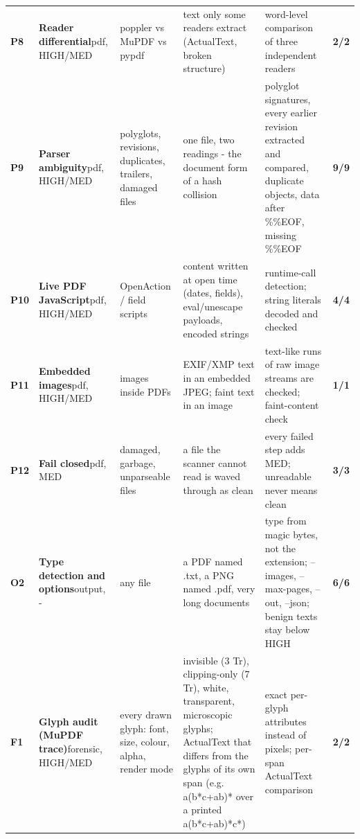 \documentclass[10pt,a4paper]{article}
\begin{document}
\begin{longtable}{@{}P{0.6cm}P{2.6cm}P{3.1cm}P{4.4cm}P{4.4cm}P{1.4cm}@{}}
\textbf{P8} & \textbf{Reader differential}\newline\footnotesize pdf, HIGH/MED & \footnotesize poppler vs MuPDF vs pypdf & \footnotesize text only some readers extract (ActualText, broken structure) & \footnotesize word-level comparison of three independent readers & \textcolor{ok}{\textbf{2/2}}\\
\textbf{P9} & \textbf{Parser ambiguity}\newline\footnotesize pdf, HIGH/MED & \footnotesize polyglots, revisions, duplicates, trailers, damaged files & \footnotesize one file, two readings - the document form of a hash collision & \footnotesize polyglot signatures, every earlier revision extracted and compared, duplicate objects, data after \%\%EOF, missing \%\%EOF & \textcolor{ok}{\textbf{9/9}}\\
\textbf{P10} & \textbf{Live PDF JavaScript}\newline\footnotesize pdf, HIGH/MED & \footnotesize OpenAction / field scripts & \footnotesize content written at open time (dates, fields), eval/unescape payloads, encoded strings & \footnotesize runtime-call detection; string literals decoded and checked & \textcolor{ok}{\textbf{4/4}}\\
\textbf{P11} & \textbf{Embedded images}\newline\footnotesize pdf, HIGH/MED & \footnotesize images inside PDFs & \footnotesize EXIF/XMP text in an embedded JPEG; faint text in an image & \footnotesize text-like runs of raw image streams are checked; faint-content check & \textcolor{ok}{\textbf{1/1}}\\
\textbf{P12} & \textbf{Fail closed}\newline\footnotesize pdf, MED & \footnotesize damaged, garbage, unparseable files & \footnotesize a file the scanner cannot read is waved through as clean & \footnotesize every failed step adds MED; unreadable never means clean & \textcolor{ok}{\textbf{3/3}}\\
\textbf{O2} & \textbf{Type detection and options}\newline\footnotesize output, - & \footnotesize any file & \footnotesize a PDF named .txt, a PNG named .pdf, very long documents & \footnotesize type from magic bytes, not the extension; --images, --max-pages, --out, --json; benign texts stay below HIGH & \textcolor{ok}{\textbf{6/6}}\\
\textbf{F1} & \textbf{Glyph audit (MuPDF trace)}\newline\footnotesize forensic, HIGH/MED & \footnotesize every drawn glyph: font, size, colour, alpha, render mode & \footnotesize invisible (3 Tr), clipping-only (7 Tr), white, transparent, microscopic glyphs; ActualText that differs from the glyphs of its own span (e.g. a(b*c+ab)* over a printed a(b*c+ab)*c*) & \footnotesize exact per-glyph attributes instead of pixels; per-span ActualText comparison & \textcolor{ok}{\textbf{2/2}}\\

\end{longtable}
\end{document}
